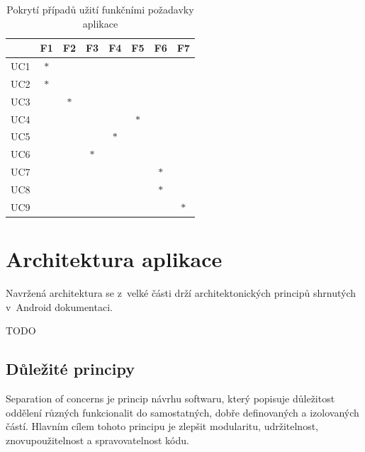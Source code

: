\begin{table}[H]
  \centering
  \begin{tabular}{|l|c|c|c|c|c|c|c|}
  \hline
       & F1     & F2     & F3     & F4     & F5     & F6     & F7  \\ \hline
  UC1  & $\ast$ &        &        &        &        &        &         \\ \hline
  UC2  & $\ast$ &        &        &        &        &        &         \\ \hline
  UC3  &        & $\ast$ &        &        &        &        &         \\ \hline
  UC4  &        &        &        &        & $\ast$ &        &         \\ \hline
  UC5  &        &        &        & $\ast$ &        &        &         \\ \hline
  UC6  &        &        & $\ast$ &        &        &        &         \\ \hline
  UC7  &        &        &        &        &        & $\ast$ &         \\ \hline
  UC8  &        &        &        &        &        & $\ast$ &         \\ \hline
  UC9  &        &        &        &        &        &        &  $\ast$ \\ \hline
  \end{tabular}
  \caption{Pokrytí případů užití funkčními požadavky aplikace}
  \label{table:tabulkaPokryti}
\end{table}
  

\section{Architektura aplikace}
Navržená architektura se z~velké části drží architektonických principů shrnutých v~Android dokumentaci. \cite{andDocArch}

TODO %

\subsection*{Důležité principy}

Separation of concerns je princip návrhu softwaru, který popisuje důležitost oddělení různých funkcionalit do samostatných, dobře definovaných a izolovaných částí.
Hlavním cílem tohoto principu je zlepšit modularitu, udržitelnost, znovupoužitelnost a spravovatelnost kódu.

